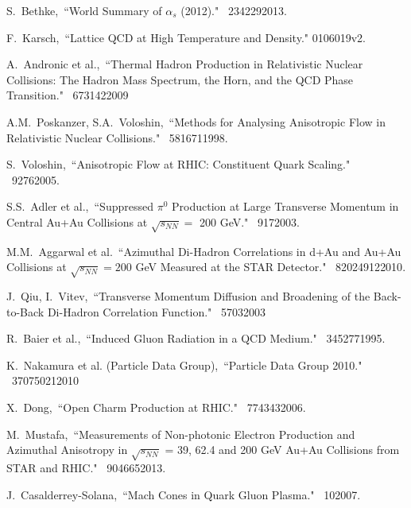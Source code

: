 \begin{thebibliography}{1000}


S.~Bethke,~``World Summary of $\alpha_{s}$ (2012)." \Journal{\NPB} {~234}{229}{2013}.

F.~Karsch,~``Lattice QCD at High Temperature and Density." \arXiv0106019v2.

A.~Andronic et al.,~``Thermal Hadron Production in Relativistic Nuclear Collisions: The Hadron Mass Spectrum, the Horn, and the QCD Phase Transition." \Journal{\PLB} {~673}{142}{2009}

A.M.~Poskanzer, S.A.~Voloshin,~``Methods for Analysing Anisotropic Flow in Relativistic Nuclear Collisions." \Journal{\PRC} {~58}{1671}{1998}.

S.~Voloshin,~``Anisotropic Flow at RHIC: Constituent Quark Scaling." \textit {}~{} {~9}{276}{2005}.

S.S.~Adler et al.,~``Suppressed $\pi^0$ Production at Large Transverse Momentum in Central Au+Au Collisions at $\sqrt{s_{NN}} = $ 200 GeV." \Journal{\PRL} {~91}{7}{2003}.

M.M.~Aggarwal et al.~``Azimuthal Di-Hadron Correlations in d+Au and Au+Au Collisions at $\sqrt{s_{NN}} = 200$ GeV Measured at the STAR Detector." \Journal{\PRC} {~82}{024912}{2010}.

J.~Qiu, I.~Vitev,~``Transverse Momentum Diffusion and Broadening of the Back-to-Back Di-Hadron Correlation Function." \Journal{\PLB} {~570}{3}{2003}

R.~Baier et al.,~``Induced Gluon Radiation in a QCD Medium." \Journal{\PLB} {~345}{277}{1995}.

K.~Nakamura et al. (Particle Data Group),~``Particle Data Group 2010." \Journal{\JPG} {~37}{075021}{2010}

X.~Dong,~``Open Charm Production at RHIC." \Journal{\NPA} {~774}{343}{2006}.

M.~Mustafa,~``Measurements of Non-photonic Electron Production and Azimuthal Anisotropy in $\sqrt{s_{NN}}$ = 39, 62.4 and 200 GeV Au+Au Collisions from STAR and RHIC." \Journal{\NPA} {~904}{665}{2013}.

J.~Casalderrey-Solana,~``Mach Cones in Quark Gluon Plasma." \Journal{\JPG} {~10}{}{2007}.


\end{thebibliography}
